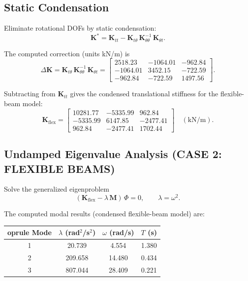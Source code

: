 \documentclass[12pt,a4paper]{article}
\newcommand{\mat}[1]{\mathbf{#1}}
\begin{document}
\subsection{Static Condensation}
Eliminate rotational DOFs by static condensation:
\begin{equation}
  \mat{K}^* = \mat{K}_{tt} - \mat{K}_{t\theta}\,\mat{K}_{\theta\theta}^{-1}\,\mat{K}_{\theta t}.
\end{equation}

The computed correction (units kN/m) is
\begin{equation}
  \Delta\mat{K} = \mat{K}_{t\theta}\,\mat{K}_{\theta\theta}^{-1}\,\mat{K}_{\theta t} =
  \begin{bmatrix}2518.23 & -1064.01 & -962.84\\-1064.01 & 3452.15 & -722.59\\-962.84 & -722.59 & 1497.56\end{bmatrix}.
\end{equation}

Subtracting from $\mat{K}_{tt}$ gives the condensed translational stiffness for the flexible-beam model:
\begin{equation}
  \mat{K}_{\text{flex}} = \begin{bmatrix}10281.77 & -5335.99 & 962.84\\-5335.99 & 6147.85 & -2477.41\\962.84 & -2477.41 & 1702.44\end{bmatrix}\quad(\text{kN/m}).
\end{equation}

\subsection{Undamped Eigenvalue Analysis (CASE 2: FLEXIBLE BEAMS)}
Solve the generalized eigenproblem
\begin{equation}
  (\mat{K}_{\text{flex}} - \lambda\,\mat{M})\,\Phi = 0, \qquad \lambda=\omega^2.
\end{equation}

The computed modal results (condensed flexible-beam model) are:
\begin{table}[H]
  \centering
  \begin{tabular}{cccc}
    	oprule
    Mode & $\lambda$ (rad$^2$/s$^2$) & $\omega$ (rad/s) & $T$ (s) \\
    \midrule
    1 & 20.739  & 4.554  & 1.380 \\
    2 & 209.658 & 14.480 & 0.434 \\
    3 & 807.044 & 28.409 & 0.221 \\
    \bottomrule
  \end{tabular}
\end{table}
\end{document}
